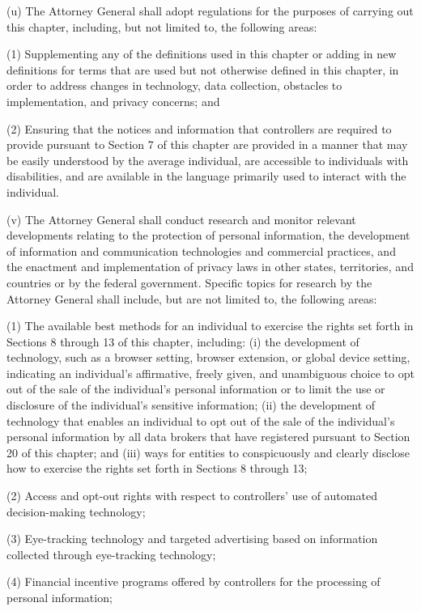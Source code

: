 (u) The Attorney General shall adopt regulations for the purposes of carrying out this chapter, including, but not limited to, the following areas:

(1) Supplementing any of the definitions used in this chapter or adding in new definitions for terms that are used but not otherwise defined in this chapter, in order to address changes in technology, data collection, obstacles to implementation, and privacy concerns; and

(2) Ensuring that the notices and information that controllers are required to provide pursuant to Section 7 of this chapter are provided in a manner that may be easily understood by the average individual, are accessible to individuals with disabilities, and are available in the language primarily used to interact with the individual.

(v) The Attorney General shall conduct research and monitor relevant developments relating to the protection of personal information, the development of information and communication technologies and commercial practices, and the enactment and implementation of privacy laws in other states, territories, and countries or by the federal government. Specific topics for research by the Attorney General shall include, but are not limited to, the following areas:

(1) The available best methods for an individual to exercise the rights set forth in Sections 8 through 13 of this chapter, including: (i) the development of technology, such as a browser setting, browser extension, or global device setting, indicating an individual’s affirmative, freely given, and unambiguous choice to opt out of the sale of the individual’s personal information or to limit the use or disclosure of the individual’s sensitive information; (ii) the development of technology that enables an individual to opt out of the sale of the individual’s personal information by all data brokers that have registered pursuant to Section 20 of this chapter; and (iii) ways for entities to conspicuously and clearly disclose how to exercise the rights set forth in Sections 8 through 13;

(2) Access and opt-out rights with respect to controllers’ use of automated decision-making technology;

(3) Eye-tracking technology and targeted advertising based on information collected through eye-tracking technology;

(4) Financial incentive programs offered by controllers for the processing of personal information;

